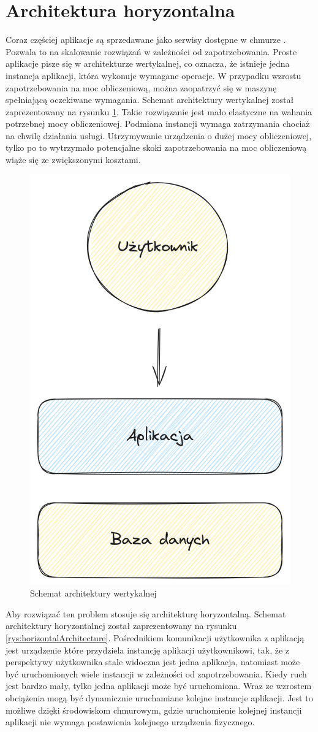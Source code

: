 \section{Architektura horyzontalna}

Coraz częściej aplikacje są sprzedawane jako serwisy dostępne w chmurze \cite{horizontalArchitecture}.
Pozwala to na skalowanie rozwiązań w zależności od zapotrzebowania.
Proste aplikacje pisze się w architekturze wertykalnej, co oznacza, że istnieje jedna instancja aplikacji, która wykonuje wymagane operacje.
W przypadku wzrostu zapotrzebowania na moc obliczeniową, można zaopatrzyć się w maszynę spełniającą oczekiwane wymagania.
Schemat architektury wertykalnej został zaprezentowany na rysunku \ref{rys:veriticalArchitecture}.
Takie rozwiązanie jest mało elastyczne na wahania potrzebnej mocy obliczeniowej.
Podmiana instancji wymaga zatrzymania chociaż na chwilę działania usługi.
Utrzymywanie urządzenia o dużej mocy obliczeniowej, tylko po to wytrzymało potencjalne skoki zapotrzebowania na moc obliczeniową wiąże się ze zwiększonymi kosztami.

\begin{figure}[!hb]
	\centering \includegraphics[width=0.5\linewidth]{rysunki/vertical_archtecture.png}
	\caption{Schemat architektury wertykalnej}
	\label{rys:veriticalArchitecture}
\end{figure}


Aby rozwiązać ten problem stosuje się architekturę horyzontalną.
Schemat architektury horyzontalnej został zaprezentowany na rysunku \ref{rys:horizontalArchitecture}.
Pośrednikiem komunikacji użytkownika z aplikacją jest urządzenie które przydziela instancję aplikacji użytkownikowi, tak, że z perspektywy użytkownika stale widoczna jest jedna aplikacja, natomiast może być uruchomionych wiele instancji w zależności od zapotrzebowania.
Kiedy ruch jest bardzo mały, tylko jedna aplikacji może być uruchomiona.
Wraz ze wzrostem obciążenia mogą być dynamicznie uruchamiane kolejne instancje aplikacji.
Jest to możliwe dzięki środowiskom chmurowym, gdzie uruchomienie kolejnej instancji aplikacji nie wymaga postawienia kolejnego urządzenia fizycznego.

